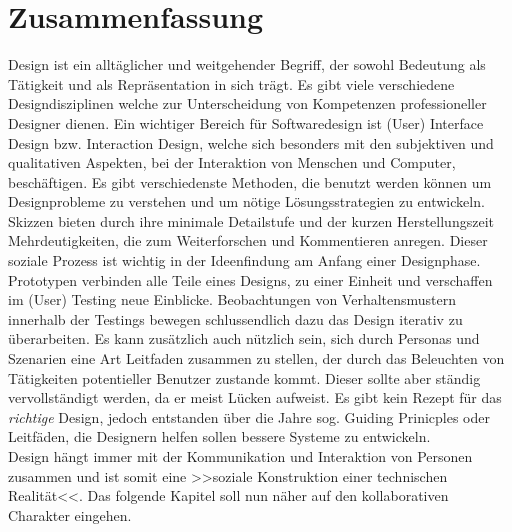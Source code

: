 \section*{Zusammenfassung}
Design ist ein alltäglicher und weitgehender Begriff, der sowohl Bedeutung als Tätigkeit und als Repräsentation in sich trägt. Es gibt viele verschiedene Designdisziplinen welche zur Unterscheidung von Kompetenzen professioneller Designer dienen. Ein wichtiger Bereich für Softwaredesign ist (User) Interface Design bzw. Interaction Design, welche sich besonders mit den subjektiven und qualitativen Aspekten, bei der Interaktion von Menschen und Computer, beschäftigen. Es gibt verschiedenste Methoden, die benutzt werden können um Designprobleme zu verstehen und um nötige Lösungsstrategien zu entwickeln. Skizzen bieten durch ihre minimale Detailstufe und der kurzen Herstellungszeit Mehrdeutigkeiten, die zum Weiterforschen und Kommentieren anregen. Dieser soziale Prozess ist wichtig in der Ideenfindung am Anfang einer Designphase. Prototypen verbinden alle Teile eines Designs, zu einer Einheit und verschaffen im (User) Testing neue Einblicke. Beobachtungen von Verhaltensmustern innerhalb der Testings bewegen schlussendlich dazu das Design iterativ zu überarbeiten. Es kann zusätzlich auch nützlich sein, sich durch Personas und Szenarien eine Art Leitfaden zusammen zu stellen, der durch das Beleuchten von Tätigkeiten potentieller Benutzer zustande kommt. Dieser sollte aber ständig vervollständigt werden, da er meist Lücken aufweist. Es gibt kein Rezept für das \emph{richtige} Design, jedoch entstanden über die Jahre sog. Guiding Prinicples oder Leitfäden, die Designern helfen sollen bessere Systeme zu entwickeln. \\
Design hängt immer mit der Kommunikation und Interaktion von Personen zusammen und ist somit eine >>soziale Konstruktion einer technischen Realität<<. Das folgende Kapitel soll nun näher auf den kollaborativen Charakter eingehen.

